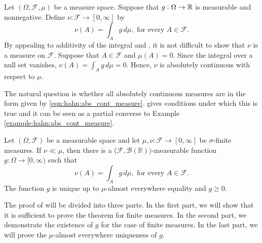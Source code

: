 \begin{example}
\label{example:hahn:abs_cont_measure}
Let $(\Omega, \mathcal{F}, \mu)$ be a measure space. Suppose that $g : \Omega \to {\mathbb R}$ is measurable and nonnegative.
Define $\nu : \mathcal{F} \to [0, \infty]$ by
\begin{equation}
    \label{eqn:hahn:abs_cont_measure}
    \nu(A) = \int_{A} g  \,d\mu, \text{ for every $A \in \mathcal{F}$}.
\end{equation}
By appealing to additivity of the integral and , it is not difficult to show that $\nu$ is a measure on $\mathcal{F}$.
Suppose that $A \in \mathcal{F}$ and $\mu(A) = 0$. Since the integral over a null set vanishes, $\nu(A) =  \int_{A} g  \,d\mu = 0$.  
Hence, $\nu$ is absolutely continuous with respect to $\mu$.
\end{example}
The natural question is whether all absolutely continuous measures are in the form given by \ref{eqn:hahn:abs_cont_measure}.   gives conditions under which this is true and it can be seen as a partial converse to Example  \ref{example:hahn:abs_cont_measure}.
\begin{theorem}
\label{thm:radon-nikodym}
Let $(\Omega, \mathcal{F})$ be a measurable space and let $\mu, \nu : \mathcal{F} \to [0, \infty]$ be $\sigma$-finite measures. If $\nu \ll \mu$, then there is a ($\mathcal{F}, \mathcal{B}(\mathbb{R}))$-measurable function $g : \Omega \to [0, \infty)$ such that 
\begin{equation*}
    \nu(A) = \int_{A} g  \,d\mu, \text{ for every $A \in \mathcal{F}$}.
\end{equation*}
The function $g$ is unique up to $\mu$-almost everywhere equality and $g \geq 0$.
\end{theorem}
\begin{proof-idea*}
The proof of  will be divided into three parts. In the first part, we will show that it is sufficient to prove the theorem for finite measures. In the second part, we demonstrate the existence of $g$ for the case of finite measures. In the last part, we will prove the $\mu$-almost everywhere uniqueness of $g$.
\end{proof-idea*}
